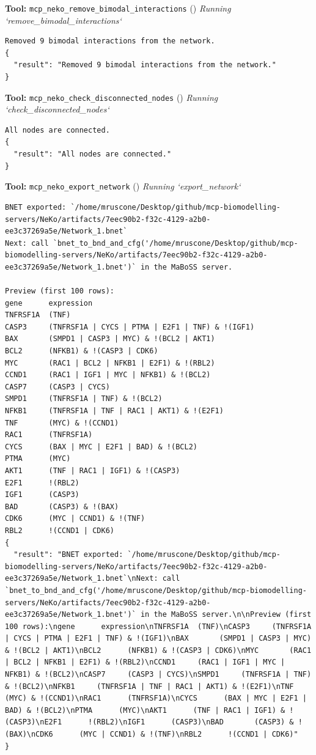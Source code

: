 \documentclass[11pt,a4paper]{article}
\begin{document}
\begin{toolokbox}
\textbf{Tool:} \texttt{mcp\_neko\_remove\_bimodal\_interactions} (\checkmark)
\textit{Running `remove\_bimodal\_interactions`}
\begin{lstlisting}
Removed 9 bimodal interactions from the network.
{
  "result": "Removed 9 bimodal interactions from the network."
}
\end{lstlisting}
\end{toolokbox}
\begin{toolokbox}
\textbf{Tool:} \texttt{mcp\_neko\_check\_disconnected\_nodes} (\checkmark)
\textit{Running `check\_disconnected\_nodes`}
\begin{lstlisting}
All nodes are connected.
{
  "result": "All nodes are connected."
}
\end{lstlisting}
\end{toolokbox}
\begin{toolokbox}
\textbf{Tool:} \texttt{mcp\_neko\_export\_network} (\checkmark)
\textit{Running `export\_network`}
\begin{lstlisting}
BNET exported: `/home/mruscone/Desktop/github/mcp-biomodelling-servers/NeKo/artifacts/7eec90b2-f32c-4129-a2b0-ee3c37269a5e/Network_1.bnet`
Next: call `bnet_to_bnd_and_cfg('/home/mruscone/Desktop/github/mcp-biomodelling-servers/NeKo/artifacts/7eec90b2-f32c-4129-a2b0-ee3c37269a5e/Network_1.bnet')` in the MaBoSS server.

Preview (first 100 rows):
gene      expression
TNFRSF1A  (TNF)
CASP3     (TNFRSF1A | CYCS | PTMA | E2F1 | TNF) & !(IGF1)
BAX       (SMPD1 | CASP3 | MYC) & !(BCL2 | AKT1)
BCL2      (NFKB1) & !(CASP3 | CDK6)
MYC       (RAC1 | BCL2 | NFKB1 | E2F1) & !(RBL2)
CCND1     (RAC1 | IGF1 | MYC | NFKB1) & !(BCL2)
CASP7     (CASP3 | CYCS)
SMPD1     (TNFRSF1A | TNF) & !(BCL2)
NFKB1     (TNFRSF1A | TNF | RAC1 | AKT1) & !(E2F1)
TNF       (MYC) & !(CCND1)
RAC1      (TNFRSF1A)
CYCS      (BAX | MYC | E2F1 | BAD) & !(BCL2)
PTMA      (MYC)
AKT1      (TNF | RAC1 | IGF1) & !(CASP3)
E2F1      !(RBL2)
IGF1      (CASP3)
BAD       (CASP3) & !(BAX)
CDK6      (MYC | CCND1) & !(TNF)
RBL2      !(CCND1 | CDK6)
{
  "result": "BNET exported: `/home/mruscone/Desktop/github/mcp-biomodelling-servers/NeKo/artifacts/7eec90b2-f32c-4129-a2b0-ee3c37269a5e/Network_1.bnet`\nNext: call `bnet_to_bnd_and_cfg('/home/mruscone/Desktop/github/mcp-biomodelling-servers/NeKo/artifacts/7eec90b2-f32c-4129-a2b0-ee3c37269a5e/Network_1.bnet')` in the MaBoSS server.\n\nPreview (first 100 rows):\ngene      expression\nTNFRSF1A  (TNF)\nCASP3     (TNFRSF1A | CYCS | PTMA | E2F1 | TNF) & !(IGF1)\nBAX       (SMPD1 | CASP3 | MYC) & !(BCL2 | AKT1)\nBCL2      (NFKB1) & !(CASP3 | CDK6)\nMYC       (RAC1 | BCL2 | NFKB1 | E2F1) & !(RBL2)\nCCND1     (RAC1 | IGF1 | MYC | NFKB1) & !(BCL2)\nCASP7     (CASP3 | CYCS)\nSMPD1     (TNFRSF1A | TNF) & !(BCL2)\nNFKB1     (TNFRSF1A | TNF | RAC1 | AKT1) & !(E2F1)\nTNF       (MYC) & !(CCND1)\nRAC1      (TNFRSF1A)\nCYCS      (BAX | MYC | E2F1 | BAD) & !(BCL2)\nPTMA      (MYC)\nAKT1      (TNF | RAC1 | IGF1) & !(CASP3)\nE2F1      !(RBL2)\nIGF1      (CASP3)\nBAD       (CASP3) & !(BAX)\nCDK6      (MYC | CCND1) & !(TNF)\nRBL2      !(CCND1 | CDK6)"
}
\end{lstlisting}
\end{toolokbox}
\end{document}
